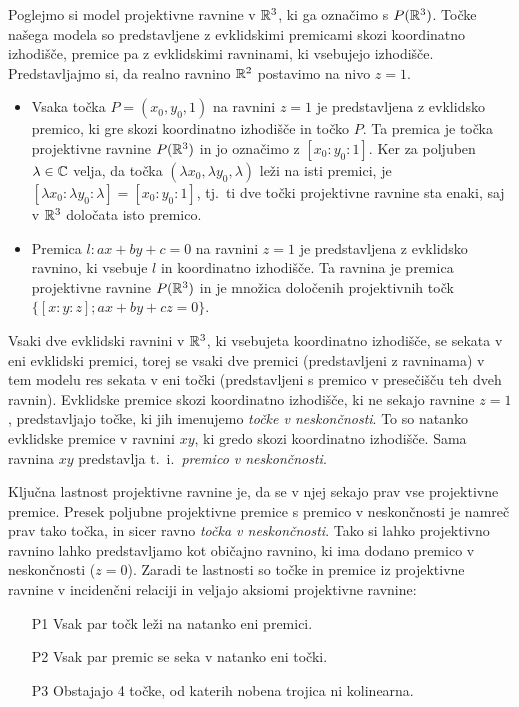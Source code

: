 Poglejmo si model projektivne ravnine v $\mathbb R^3$, ki ga označimo s $P(\mathbb R^3)$. Točke našega modela so predstavljene z evklidskimi premicami skozi koordinatno izhodišče, premice pa z evklidskimi ravninami, ki vsebujejo izhodišče. Predstavljajmo si, da realno ravnino $\mathbb R^2$ postavimo na nivo $z = 1$.
\begin{itemize}
    \item Vsaka točka $P = (x_0, y_0, 1)$ na ravnini $z = 1$ je predstavljena z evklidsko premico, ki gre skozi koordinatno izhodišče in točko $P$. Ta premica je točka projektivne ravnine $P(\mathbb R^3)$ in jo označimo z $[x_0 : y_0 : 1]$. Ker za poljuben $\lambda \in \mathbb C$ velja, da točka $(\lambda x_0, \lambda y_0, \lambda)$ leži na isti premici, je $[\lambda x_0 : \lambda y_0 : \lambda] = [x_0 : y_0 : 1]$, tj.\ ti dve točki projektivne ravnine sta enaki, saj v $\mathbb R^3$ določata isto premico.
    \item Premica $l: ax + by + c = 0$ na ravnini $z = 1$ je predstavljena z evklidsko ravnino, ki vsebuje $l$ in koordinatno izhodišče. Ta ravnina je premica projektivne ravnine $P(\mathbb R^3)$ in je množica določenih projektivnih točk $\{ [x:y:z]; ax+by+cz = 0\}$.
\end{itemize}
Vsaki dve evklidski ravnini v $\mathbb R^3$, ki vsebujeta koordinatno izhodišče, se sekata v eni evklidski premici, torej se vsaki dve premici (predstavljeni z ravninama) v tem modelu res sekata v eni točki (predstavljeni s premico v presečišču teh dveh ravnin). Evklidske premice skozi koordinatno izhodišče, ki ne sekajo ravnine $z = 1$, predstavljajo točke, ki jih imenujemo \emph{točke v neskončnosti}. To so natanko evklidske premice v ravnini $xy$, ki gredo skozi koordinatno izhodišče. Sama ravnina $xy$ predstavlja t.~i.\ \emph{premico v neskončnosti}.

Ključna lastnost projektivne ravnine je, da se v njej sekajo prav vse projektivne premice. Presek poljubne projektivne premice s premico v neskončnosti je namreč prav tako točka, in sicer ravno \emph{točka v neskončnosti}. Tako si lahko projektivno ravnino lahko predstavljamo kot običajno ravnino, ki ima dodano premico v neskončnosti ($z = 0$). Zaradi te lastnosti so točke in premice iz projektivne ravnine v incidenčni relaciji in veljajo aksiomi projektivne ravnine:
\begin{itemize}
    \item [P1] Vsak par točk leži na natanko eni premici.
    \item [P2] Vsak par premic se seka v natanko eni točki.
    \item [P3] Obstajajo 4 točke, od katerih nobena trojica ni kolinearna.
\end{itemize}


